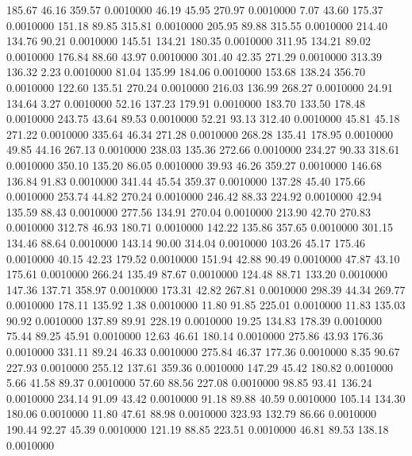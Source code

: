  185.67   46.16  359.57   0.0010000
  46.19   45.95  270.97   0.0010000
   7.07   43.60  175.37   0.0010000
 151.18   89.85  315.81   0.0010000
 205.95   89.88  315.55   0.0010000
 214.40  134.76   90.21   0.0010000
 145.51  134.21  180.35   0.0010000
 311.95  134.21   89.02   0.0010000
 176.84   88.60   43.97   0.0010000
 301.40   42.35  271.29   0.0010000
 313.39  136.32    2.23   0.0010000
  81.04  135.99  184.06   0.0010000
 153.68  138.24  356.70   0.0010000
 122.60  135.51  270.24   0.0010000
 216.03  136.99  268.27   0.0010000
  24.91  134.64    3.27   0.0010000
  52.16  137.23  179.91   0.0010000
 183.70  133.50  178.48   0.0010000
 243.75   43.64   89.53   0.0010000
  52.21   93.13  312.40   0.0010000
  45.81   45.18  271.22   0.0010000
 335.64   46.34  271.28   0.0010000
 268.28  135.41  178.95   0.0010000
  49.85   44.16  267.13   0.0010000
 238.03  135.36  272.66   0.0010000
 234.27   90.33  318.61   0.0010000
 350.10  135.20   86.05   0.0010000
  39.93   46.26  359.27   0.0010000
 146.68  136.84   91.83   0.0010000
 341.44   45.54  359.37   0.0010000
 137.28   45.40  175.66   0.0010000
 253.74   44.82  270.24   0.0010000
 246.42   88.33  224.92   0.0010000
  42.94  135.59   88.43   0.0010000
 277.56  134.91  270.04   0.0010000
 213.90   42.70  270.83   0.0010000
 312.78   46.93  180.71   0.0010000
 142.22  135.86  357.65   0.0010000
 301.15  134.46   88.64   0.0010000
 143.14   90.00  314.04   0.0010000
 103.26   45.17  175.46   0.0010000
  40.15   42.23  179.52   0.0010000
 151.94   42.88   90.49   0.0010000
  47.87   43.10  175.61   0.0010000
 266.24  135.49   87.67   0.0010000
 124.48   88.71  133.20   0.0010000
 147.36  137.71  358.97   0.0010000
 173.31   42.82  267.81   0.0010000
 298.39   44.34  269.77   0.0010000
 178.11  135.92    1.38   0.0010000
  11.80   91.85  225.01   0.0010000
  11.83  135.03   90.92   0.0010000
 137.89   89.91  228.19   0.0010000
  19.25  134.83  178.39   0.0010000
  75.44   89.25   45.91   0.0010000
  12.63   46.61  180.14   0.0010000
 275.86   43.93  176.36   0.0010000
 331.11   89.24   46.33   0.0010000
 275.84   46.37  177.36   0.0010000
   8.35   90.67  227.93   0.0010000
 255.12  137.61  359.36   0.0010000
 147.29   45.42  180.82   0.0010000
   5.66   41.58   89.37   0.0010000
  57.60   88.56  227.08   0.0010000
  98.85   93.41  136.24   0.0010000
 234.14   91.09   43.42   0.0010000
  91.18   89.88   40.59   0.0010000
 105.14  134.30  180.06   0.0010000
  11.80   47.61   88.98   0.0010000
 323.93  132.79   86.66   0.0010000
 190.44   92.27   45.39   0.0010000
 121.19   88.85  223.51   0.0010000
  46.81   89.53  138.18   0.0010000
